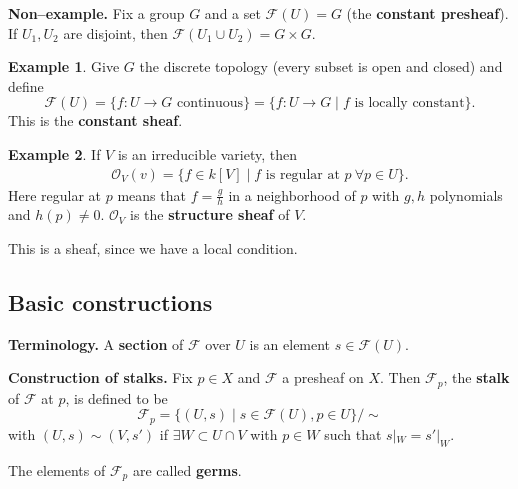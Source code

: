 \documentclass{article}
\theoremstyle{definition}
\newtheorem{example}{Example}[section]
\begin{document}
\textbf{Non--example.} Fix a group $G$ and a set $\mathcal{F}(U)=G$ (the \textbf{constant presheaf}). If $U_1, U_2$ are disjoint, then $\mathcal{F}(U_1 \cup U_2) = G \times G$.

\begin{example}
    Give $G$ the discrete topology (every subset is open and closed) and define $$\mathcal{F}(U) = \{f : U \to G \text{ continuous}\} = \{f : U \to G \mid f \text{ is locally constant}\}.$$
    This is the \textbf{constant sheaf}.
\end{example}
\begin{example}
    If $V$ is an irreducible variety, then 
    \begin{align*}
        \mathcal{O}_V(v) = \{f \in k[V] \mid f \text{ is regular at }p ~\forall p \in U\}.
    \end{align*}
    Here regular at $p$ means that $f = \frac{g}{h}$ in a neighborhood of $p$ with $g,h$ polynomials and $h(p) \neq 0$. $\mathcal{O}_V$ is the \textbf{structure sheaf} of $V$.
    \vspace{1mm}
     
    This is a sheaf, since we have a local condition.
\end{example}

\subsection{Basic constructions}

\textbf{Terminology.} A \textbf{section} of $\mathcal{F}$ over $U$ is an element $s \in \mathcal{F}(U)$.

\vspace{1mm}
 
\textbf{Construction of stalks.} Fix $p \in X$ and $\mathcal{F}$ a presheaf on $X$. Then $\mathcal{F}_p$, the \textbf{stalk} of $\mathcal{F}$ at $p$, is defined to be $$\mathcal{F}_p = \{(U,s) \mid s \in \mathcal{F}(U), p \in U\}/\sim$$
with $(U,s) \sim (V, s')$ if $\exists W \subset U \cap V$ with $p \in W$ such that $s|_W = s'|_W$. 
\vspace{1mm}
 
The elements of $\mathcal{F}_p$ are called \textbf{germs}.
\end{document}
